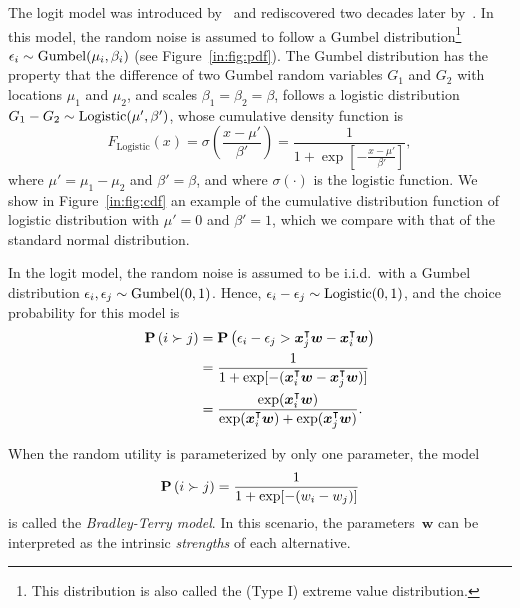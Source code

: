 The logit model was introduced by~\citet{zermelo1928berechnung} and rediscovered two decades later by~\citet{bradley1952rank}.
In this model, the random noise is assumed to follow a Gumbel distribution\footnote{This distribution is also called the (Type I) extreme value distribution.} $\epsilon_i \sim \mathrm{Gumbel}( \mu_i, \beta_i )$ (see Figure~\ref{in:fig:pdf}).
The Gumbel distribution has the property that the difference of two Gumbel random variables $G_1$ and $G_2$ with locations $\mu_1$ and $\mu_2$, and scales $\beta_1 = \beta_2 = \beta$, follows a logistic distribution $G_1 - G_2 \sim \mathrm{Logistic}( \mu', \beta' )$, whose cumulative density function is
\begin{equation*}
	F_{\text{Logistic}}(x)
	= \sigma\left(\frac{x - \mu'}{\beta'}\right)
	= \frac{1}{1 + \exp \left[ - \frac{x  - \mu'}{\beta'} \right]},
\end{equation*}
where $\mu' = \mu_1 - \mu_2$ and $\beta' = \beta$, and where $\sigma(\cdot)$ is the logistic function.
We show in Figure~\ref{in:fig:cdf} an example of the cumulative distribution function of logistic distribution with $\mu' = 0$ and $\beta' = 1$, which we compare with that of the standard normal distribution.

In the logit model, the random noise is assumed to be i.i.d.\ with a Gumbel distribution $\epsilon_i, \epsilon_j \sim \mathrm{Gumbel}( 0, 1 )$.
Hence, $\epsilon_i - \epsilon_j \sim \mathrm{Logistic}( 0, 1 )$, and  the choice probability for this model is
\begin{align}
	\label{in:eq:logit}
	\mathbf{P}\left( i \succ j \right) & = \mathbf{P}\left( \epsilon_i - \epsilon_j > \bm{x}_j^\intercal \bm{w} - \bm{x}_i^\intercal \bm{w} \right)              \nonumber \\
	                 & = \frac{1}{1 + \exp[-(\bm{x}_i^\intercal \bm{w} - \bm{x}_j^\intercal \bm{w})]}                        \nonumber \\
	                 & = \frac{\exp(\bm{x}_i^\intercal \bm{w})}{\exp(\bm{x}_i^\intercal \bm{w}) + \exp(\bm{x}_j^\intercal \bm{w})}.
\end{align}

When the random utility is parameterized by only one parameter, the model
\begin{equation}
	\label{in:eq:bradley-terry}
	\mathbf{P}\left( i \succ j \right) = \frac{1}{1 + \exp[-(w_i - w_j)]}
\end{equation}
is called the \emph{Bradley-Terry model}.
In this scenario, the parameters~$\bm{w}$ can be interpreted as the intrinsic \emph{strengths} of each alternative.

